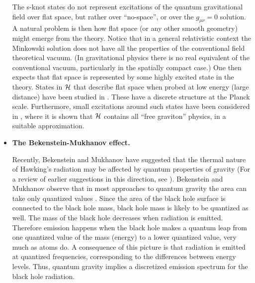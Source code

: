 \begin{itemize}
The s-knot states do not represent excitations of the quantum 
gravitational field over flat space, but rather over 
``no-space'', or over the $g_{\mu\nu}=0$ solution.  A natural 
problem is then how flat space (or any other smooth geometry) 
might emerge from the theory.  Notice that in a general 
relativistic context the Minkowski solution does not have all the 
properties of the conventional field theoretical vacuum.  (In 
gravitational physics there is no real equivalent of the 
conventional vacuum, particularly in the spatially compact case.)  
One then expects that flat space is represented by some highly 
excited state in the theory.  States in $\cal H$ that describe 
flat space when probed at low energy (large distance) have been 
studied in \cite{weave,Zegwaard,Borissov,GrotRovelli}.  These 
have a discrete structure at the Planck scale.  Furthermore, 
small excitations around such states have been considered in 
\cite{IwasakiRovelli}, where it is shown that $\cal H$ contains 
all ``free graviton'' physics, in a suitable approximation.

\item {\bf The Bekenstein-Mukhanov effect.}

Recently, Bekenstein and Mukhanov \cite{BekensteinMukhanov} have 
suggested that the thermal nature of Hawking's radiation 
\cite{Hawking,Hawking2} may be affected by quantum properties of 
gravity (For a review of earlier suggestions in this direction, 
see \cite{SmolinMoG}).  Bekenstein and Mukhanov observe that in 
most approaches to quantum gravity the area can take only 
quantized values \cite{Garay}.  Since the area of the black hole 
surface is connected to the black hole mass, black hole mass is 
likely to be quantized as well.  The mass of the black hole 
decreases when radiation is emitted.  Therefore emission happens 
when the black hole makes a quantum leap from one quantized value 
of the mass (energy) to a lower quantized value, very much as 
atoms do.  A consequence of this picture is that radiation is 
emitted at quantized frequencies, corresponding to the 
differences between energy levels.  Thus, quantum gravity implies 
a discretized emission spectrum for the black hole radiation.


\end{itemize}
